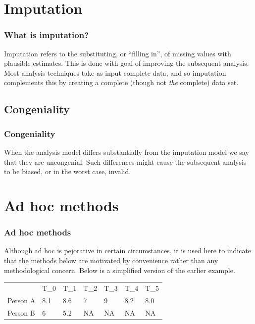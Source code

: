 \documentclass{beamer}
\begin{document}
\section{Imputation}
\begin{frame}
\frametitle{What is imputation?}
Imputation refers to the substituting, or \enquote{filling in}, of missing values with plausible estimates. This is done with goal of improving the subsequent analysis. Most analysis techniques take as input complete data, and so imputation complements this by creating a complete (though not \textit{the} complete) data set.
\end{frame}

\subsection{Congeniality}
\begin{frame}
\frametitle{Congeniality}
When the analysis model differs substantially from the imputation model we say that they are uncongenial. Such differences might cause the subsequent analysis to be biased, or in the worst case, invalid. 
\end{frame}

\section{Ad hoc methods}
\begin{frame}
\frametitle{Ad hoc methods}
Although ad hoc is pejorative in certain circumstances, it is used here to indicate that the methods below are motivated by convenience rather than any methodological concern. Below is a simplified version of the earlier example.

\begin{table}[]
	\begin{tabular}{lllllll}
		& T\_0 & T\_1 & T\_2 & T\_3 & T\_4 & T\_5 \\
		Person A & 8.1  & 8.6  & 7    & 9    & 8.2  & 8.0  \\
		Person B & 6    & 5.2  & NA   & NA   & NA   & NA 
	\end{tabular}
\end{table}

\end{frame}
\end{document}
